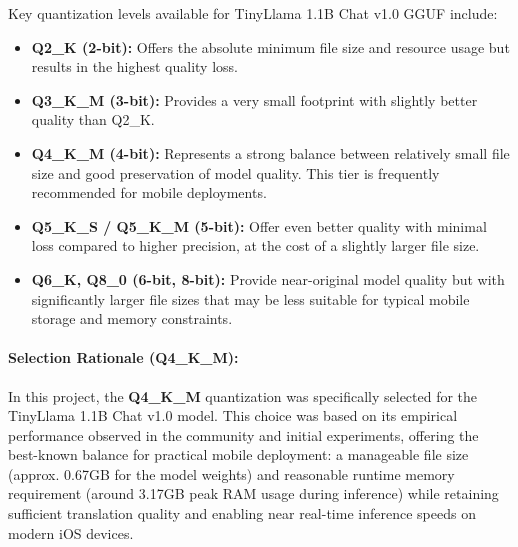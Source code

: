 \documentclass[12pt]{article}
\begin{document}
Key quantization levels available for TinyLlama 1.1B Chat v1.0 GGUF include:
\begin{itemize}
  \item \textbf{Q2\_K (2-bit):} Offers the absolute minimum file size and resource usage but results in the highest quality loss.
  \item \textbf{Q3\_K\_M (3-bit):} Provides a very small footprint with slightly better quality than Q2\_K.
  \item \textbf{Q4\_K\_M (4-bit):} Represents a strong balance between relatively small file size and good preservation of model quality. This tier is frequently recommended for mobile deployments.
  \item \textbf{Q5\_K\_S / Q5\_K\_M (5-bit):} Offer even better quality with minimal loss compared to higher precision, at the cost of a slightly larger file size.
  \item \textbf{Q6\_K, Q8\_0 (6-bit, 8-bit):} Provide near-original model quality but with significantly larger file sizes that may be less suitable for typical mobile storage and memory constraints.
\end{itemize}

\paragraph{Selection Rationale (Q4\_K\_M):}
In this project, the \textbf{Q4\_K\_M} quantization was specifically selected for the TinyLlama 1.1B Chat v1.0 model. This choice was based on its empirical performance observed in the community and initial experiments, offering the best-known balance for practical mobile deployment: a manageable file size (approx. 0.67GB for the model weights) and reasonable runtime memory requirement (around 3.17GB peak RAM usage during inference) while retaining sufficient translation quality and enabling near real-time inference speeds on modern iOS devices.
\end{document}
